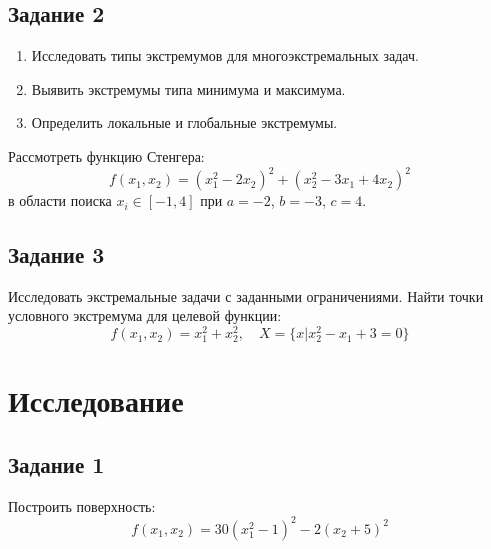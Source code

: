 \documentclass[a4paper, 12pt]{article}   	%
\begin{document}
    \subsection{Задание 2}
    \begin{enumerate}
        \item Исследовать типы экстремумов для многоэкстремальных задач.
        \item Выявить экстремумы типа минимума и максимума.
        \item Определить локальные и глобальные экстремумы.
    \end{enumerate}
    
    Рассмотреть функцию Стенгера: 
    \begin{equation*}
        f(x_1, x_2) = (x_1^2 - 2x_2)^2 + (x_2^2 - 3x_1 + 4x_2)^2
    \end{equation*}
    в области поиска $x_i \in [-1, 4]$ при $a = -2$, $b = -3$, $c = 4$.

\subsection{Задание 3}
    Исследовать экстремальные задачи с заданными ограничениями. Найти точки условного экстремума для целевой функции:
    \begin{equation*}
        f(x_1, x_2) = x_1^2 + x_2^2, \quad X = \{x | x_2^2 - x_1 + 3 = 0 \}
    \end{equation*}

\newpage

\section{Исследование}

\subsection{Задание 1}
    Построить поверхность:
    \begin{equation*}
        f(x_1, x_2) = 30 (x^2_1-1)^2 - 2(x_2+5)^2
    \end{equation*}
    
\end{document}
